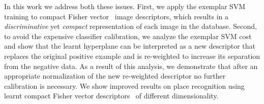 \documentclass[table]{article} %
\begin{document}

In this work we address both these issues. 
First, we apply the exemplar SVM training to compact Fisher vector~\cite{Jegou2011,Perronnin2010} image descriptors, which results in a {\em discriminative} yet {\em compact} representation of each image in the database.  
Second, to avoid the expensive classifier calibration, we analyze the exemplar SVM cost and show that the learnt hyperplane can be interpreted
as a new descriptor that replaces the original positive example and is re-weighted to increase its separation from the negative data.
As a result of this analysis, we demonstrate that after an appropriate normalization of the new re-weighted descriptor no further calibration is necessary.
We show improved results on place recognition using learnt compact Fisher vector descriptors~\cite{Jegou2011} of different dimensionality. %
\end{document}
